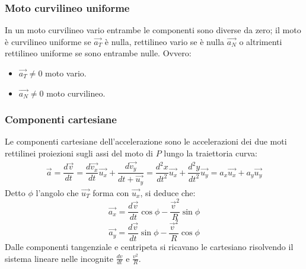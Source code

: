 \documentclass[class=book, crop=false, oneside, 12pt]{standalone}
\begin{document}
		\subsubsection{Moto curvilineo uniforme}
    In un moto curvilineo vario entrambe le componenti sono diverse da zero; il moto \`e curvilineo uniforme se $\overrightarrow{a_T}$ \`e nulla, rettilineo vario se \`e nulla $\overrightarrow{a_N}$ o altrimenti rettilineo uniforme se sono entrambe nulle.
		Ovvero:
		\begin{multicols}{2}
			\begin{itemize}
        \item $\overrightarrow{a_T}\neq 0$ moto vario.
        \item $\overrightarrow{a_N}\neq 0$ moto curvilineo.
			\end{itemize}
		\end{multicols}
		\subsubsection{Componenti cartesiane}
		Le componenti cartesiane dell'accelerazione sono le accelerazioni dei due moti rettilinei proiezioni sugli assi del moto di $P$ lungo la traiettoria curva:
		\begin{align*}
      \overrightarrow{a}=\dfrac{d\overrightarrow{v}}{dt}=\dfrac{d\overrightarrow{v_x}}{dt}\overrightarrow{u_x}+\dfrac{d\overrightarrow{v_y}}{dt+\overrightarrow{u_y}}=\dfrac{d^2x}{dt^2}\overrightarrow{u_x}+\dfrac{d^2y}{dt^2}\overrightarrow{u_y}=a_x\overrightarrow{u_x}+a_y\overrightarrow{u_y}
		\end{align*}
    Detto $\phi$ l'angolo che $\overrightarrow{u_T}$ forma con $\overrightarrow{u_x}$, si deduce che:
    $$\overrightarrow{a_x}=\dfrac{d\overrightarrow{v}}{dt}\cos\phi - \dfrac{\overrightarrow{v}^2}{R}\sin\phi$$
    $$\overrightarrow{a_y}=\dfrac{d\overrightarrow{v}}{dt}\sin\phi - \dfrac{\overrightarrow{v}^2}{R}\cos\phi$$
		Dalle componenti tangenziale e centripeta si ricavano le cartesiano risolvendo il sistema lineare nelle incognite $\frac{dv}{dt}$ e $\frac{v^2}{R}$.
\end{document}
